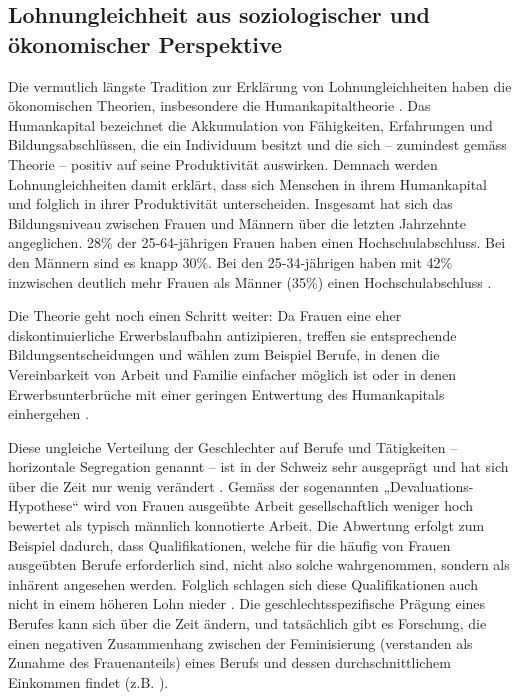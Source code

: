 \documentclass[a4paper,12pt]{article}
\renewcommand{\baselinestretch}{1.1}
\newif\ifcomments
\newcommand{\comment}[1]{%
    \ifcomments\marginpar{\renewcommand{\baselinestretch}{1}\tiny\hspace*{-1.1em}\colorbox{gray!20}%
    {\textcolor{red}{\parbox[t]{.9in}{\raggedright #1}}}}\fi}
\begin{document}
\subsection{Lohnungleichheit aus soziologischer und ökonomischer Perspektive}

Die vermutlich längste Tradition zur Erklärung von Lohnungleichheiten haben die
ökonomischen Theorien, insbesondere die Humankapitaltheorie \citep{Becker-1975,
Mincer-1958,Mincer-Polachek-1974}. Das Humankapital bezeichnet die Akkumulation
von Fähigkeiten, Erfahrungen und Bildungsabschlüssen, die ein Individuum
besitzt und die sich -- zumindest gemäss Theorie -- positiv auf seine
Produktivität auswirken. Demnach werden Lohnungleichheiten damit erklärt, dass
sich Menschen in ihrem Humankapital und folglich in ihrer Produktivität
unterscheiden. 
Insgesamt hat sich das Bildungsniveau zwischen Frauen und Männern über die letzten Jahrzehnte angeglichen. 28\% der 25-64-jährigen Frauen haben einen Hochschulabschluss. Bei den Männern sind es knapp 30\%. Bei den 25-34-jährigen haben mit 42\% inzwischen deutlich mehr Frauen als Männer (35\%) einen Hochschulabschluss \citep{BFS-2019b}. 

Die Theorie geht noch einen Schritt weiter: Da Frauen eine eher
diskontinuierliche Erwerbslaufbahn antizipieren, treffen sie entsprechende
Bildungsentscheidungen und wählen zum Beispiel Berufe, in denen die
Vereinbarkeit von Arbeit und Familie einfacher möglich ist oder in denen
Erwerbsunterbrüche mit einer geringen Entwertung des Humankapitals einhergehen
\citep{Polachek-1981}.

\comment{diesen Abschnitt in den Theorieteil?}
Diese ungleiche Verteilung der Geschlechter auf Berufe und Tätigkeiten -- horizontale Segregation genannt -- ist in der Schweiz sehr ausgeprägt und hat sich über die Zeit nur wenig verändert \citep{Buchmann-Kriesi-2012,Charles-2005,Schwiter-etal-2014}.
Gemäss der sogenannten „Devaluations-Hypothese“
\citep{England-etal-1988,Liebeskind-2004} wird von Frauen ausgeübte Arbeit
gesellschaftlich weniger hoch bewertet als typisch männlich konnotierte Arbeit. Die
Abwertung erfolgt zum Beispiel dadurch, dass Qualifikationen, welche für die
häufig von Frauen ausgeübten Berufe erforderlich sind, nicht also solche
wahrgenommen, sondern als inhärent angesehen werden. Folglich schlagen sich
diese Qualifikationen auch nicht in einem höheren Lohn nieder
\citep{England-1992,England-2005,Gottschall-1995}. Die geschlechtsspezifische
Prägung eines Berufes kann sich über die Zeit ändern, und tatsächlich gibt es
Forschung, die einen negativen Zusammenhang zwischen der Feminisierung
(verstanden als Zunahme des Frauenanteils) eines Berufs und dessen
durchschnittlichem Einkommen findet (z.B.
\citealp{Levanon-etal-2009,Murphy-Oesch-2016}).
\end{document}
